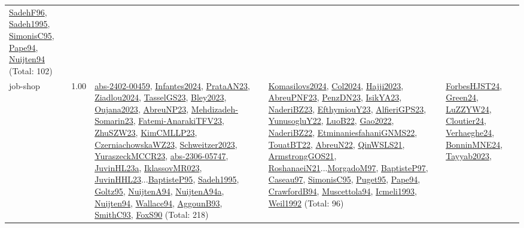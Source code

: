 {\begin{longtable}{p{3cm}r>{\raggedright\arraybackslash}p{6cm}>{\raggedright\arraybackslash}p{6cm}>{\raggedright\arraybackslash}p{8cm}}
\hyperref[detail:SadehF96]{SadehF96}, \hyperref[detail:Sadeh1995]{Sadeh1995}, \hyperref[detail:SimonisC95]{SimonisC95}, \hyperref[detail:Pape94]{Pape94}, \hyperref[detail:Nuijten94]{Nuijten94} (Total: 102)\\
\index{job-shop}\index{Concepts!job-shop}job-shop &  1.00 & \hyperref[detail:abs-2402-00459]{abs-2402-00459}, \hyperref[detail:Infantes2024]{Infantes2024}, \hyperref[detail:PrataAN23]{PrataAN23}, \hyperref[detail:Ziadlou2024]{Ziadlou2024}, \hyperref[detail:TasselGS23]{TasselGS23}, \hyperref[detail:Bley2023]{Bley2023}, \hyperref[detail:Oujana2023]{Oujana2023}, \hyperref[detail:AbreuNP23]{AbreuNP23}, \hyperref[detail:Mehdizadeh-Somarin23]{Mehdizadeh-Somarin23}, \hyperref[detail:Fatemi-AnarakiTFV23]{Fatemi-AnarakiTFV23}, \hyperref[detail:ZhuSZW23]{ZhuSZW23}, \hyperref[detail:KimCMLLP23]{KimCMLLP23}, \hyperref[detail:CzerniachowskaWZ23]{CzerniachowskaWZ23}, \hyperref[detail:Schweitzer2023]{Schweitzer2023}, \hyperref[detail:YuraszeckMCCR23]{YuraszeckMCCR23}, \hyperref[detail:abs-2306-05747]{abs-2306-05747}, \hyperref[detail:JuvinHL23a]{JuvinHL23a}, \hyperref[detail:IklassovMR023]{IklassovMR023}, \hyperref[detail:JuvinHHL23]{JuvinHHL23}...\hyperref[detail:BaptisteP95]{BaptisteP95}, \hyperref[detail:Sadeh1995]{Sadeh1995}, \hyperref[detail:Goltz95]{Goltz95}, \hyperref[detail:NuijtenA94]{NuijtenA94}, \hyperref[detail:NuijtenA94a]{NuijtenA94a}, \hyperref[detail:Nuijten94]{Nuijten94}, \hyperref[detail:Wallace94]{Wallace94}, \hyperref[detail:AggounB93]{AggounB93}, \hyperref[detail:SmithC93]{SmithC93}, \hyperref[detail:FoxS90]{FoxS90} (Total: 218) & \hyperref[detail:Komasilovs2024]{Komasilovs2024}, \hyperref[detail:Col2024]{Col2024}, \hyperref[detail:Hajji2023]{Hajji2023}, \hyperref[detail:AbreuPNF23]{AbreuPNF23}, \hyperref[detail:PenzDN23]{PenzDN23}, \hyperref[detail:IsikYA23]{IsikYA23}, \hyperref[detail:NaderiBZ23]{NaderiBZ23}, \hyperref[detail:EfthymiouY23]{EfthymiouY23}, \hyperref[detail:AlfieriGPS23]{AlfieriGPS23}, \hyperref[detail:YunusogluY22]{YunusogluY22}, \hyperref[detail:LuoB22]{LuoB22}, \hyperref[detail:Gao2022]{Gao2022}, \hyperref[detail:NaderiBZ22]{NaderiBZ22}, \hyperref[detail:EtminaniesfahaniGNMS22]{EtminaniesfahaniGNMS22}, \hyperref[detail:TouatBT22]{TouatBT22}, \hyperref[detail:AbreuN22]{AbreuN22}, \hyperref[detail:QinWSLS21]{QinWSLS21}, \hyperref[detail:ArmstrongGOS21]{ArmstrongGOS21}, \hyperref[detail:RoshanaeiN21]{RoshanaeiN21}...\hyperref[detail:MorgadoM97]{MorgadoM97}, \hyperref[detail:BaptisteP97]{BaptisteP97}, \hyperref[detail:Caseau97]{Caseau97}, \hyperref[detail:SimonisC95]{SimonisC95}, \hyperref[detail:Puget95]{Puget95}, \hyperref[detail:Pape94]{Pape94}, \hyperref[detail:CrawfordB94]{CrawfordB94}, \hyperref[detail:Muscettola94]{Muscettola94}, \hyperref[detail:Icmeli1993]{Icmeli1993}, \hyperref[detail:Weil1992]{Weil1992} (Total: 96) & \hyperref[detail:ForbesHJST24]{ForbesHJST24}, \hyperref[detail:Green24]{Green24}, \hyperref[detail:LuZZYW24]{LuZZYW24}, \hyperref[detail:Cloutier24]{Cloutier24}, \hyperref[detail:Verhaeghe24]{Verhaeghe24}, \hyperref[detail:BonninMNE24]{BonninMNE24}, \hyperref[detail:Tayyab2023]{Tayyab2023}, 
\end{longtable}}
